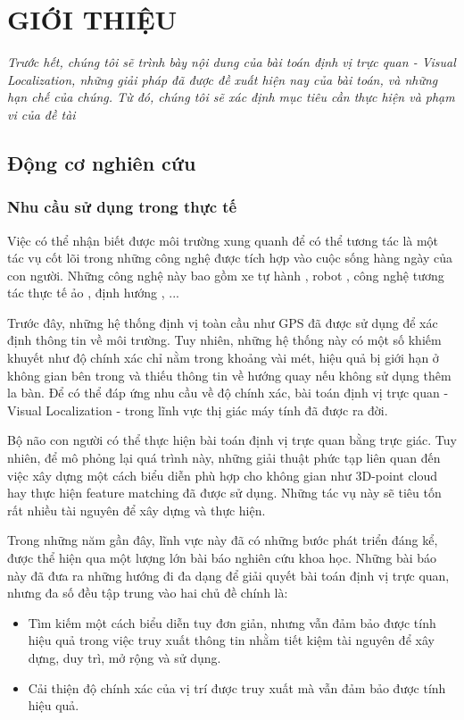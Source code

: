 \chapter{GIỚI THIỆU}

\textit{Trước hết, chúng tôi sẽ trình bày nội dung của bài toán định vị trực quan - Visual Localization, những giải pháp đã được đề xuất hiện nay của bài toán, và những hạn chế của chúng. Từ đó, chúng tôi sẽ xác định mục tiêu cần thực hiện và phạm vi của đề tài}

\section{Động cơ nghiên cứu}

\subsection{Nhu cầu sử dụng trong thực tế}

Việc có thể nhận biết được môi trường xung quanh để có thể tương tác là một tác vụ cốt lõi trong những công nghệ được tích hợp vào cuộc sống hàng ngày của con người. Những công nghệ này bao gồm xe tự hành \cite{chaabane2021end}, robot \cite{sunderhauf2015place}, công nghệ tương tác thực tế ảo \cite{middelberg2014scalable}, định hướng \cite{sarlin2023orienternet}, ...

Trước đây, những hệ thống định vị toàn cầu như GPS đã được sử dụng để xác định thông tin về môi trường. Tuy nhiên, những hệ thống này có một số khiếm khuyết như độ chính xác chỉ nằm trong khoảng vài mét, hiệu quả bị giới hạn ở không gian bên trong và thiếu thông tin về hướng quay nếu không sử dụng thêm la bàn. Để có thể đáp ứng nhu cầu về độ chính xác, bài toán định vị trực quan - Visual Localization - trong lĩnh vực thị giác máy tính đã được ra đời.

Bộ não con người có thể thực hiện bài toán định vị trực quan bằng trực giác. Tuy nhiên, để mô phỏng lại quá trình này, những giải thuật phức tạp liên quan đến việc xây dựng một cách biểu diễn phù hợp cho không gian như 3D-point cloud hay thực hiện feature matching đã được sử dụng. Những tác vụ này sẽ tiêu tốn rất nhiều tài nguyên để xây dựng và thực hiện.

Trong những năm gần đây, lĩnh vực này đã có những bước phát triển đáng kể, được thể hiện qua một lượng lớn bài báo nghiên cứu khoa học. Những bài báo này đã đưa ra những hướng đi đa dạng để giải quyết bài toán định vị trực quan, nhưng đa số đều tập trung vào hai chủ đề chính là:
\begin{itemize}
    \item Tìm kiếm một cách biểu diễn tuy đơn giản, nhưng vẫn đảm bảo được tính hiệu quả trong việc truy xuất thông tin nhằm tiết kiệm tài nguyên để xây dựng, duy trì, mở rộng và sử dụng.
    \item Cải thiện độ chính xác của vị trí được truy xuất mà vẫn đảm bảo được tính hiệu quả.
\end{itemize}
\newpage
